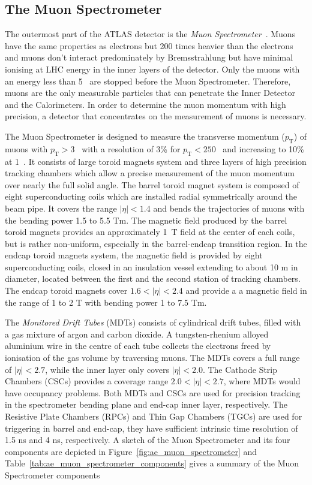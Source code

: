 
\subsection{The Muon Spectrometer}
\label{subsec:ae_the_muon_spectrometer}
The outermost part of the ATLAS detector is the \textit{Muon Spectrometer}~\cite{1748-0221-3-08-S08003,Palestini:681459,Diehl:2009bw}.
Muons have the same properties as electrons but 200 times heavier than the electrons and muons don't interact predominately by Bremsstrahlung but have minimal ionising at LHC energy in the inner layers of the detector.
Only the muons with an energy less than 5~{\GeV} are stopped before the Muon Spectrometer.
Therefore, muons are the only measurable particles that can penetrate the Inner Detector and the Calorimeters.
In order to determine the muon momentum with high precision, a detector that concentrates on the measurement of muons is necessary.

The Muon Spectrometer is designed to measure the transverse momentum ($p_{\mathrm{T}}$) of muons with $p_{\mathrm{T}} > 3$~{\GeV} with a resolution of 3\% for $p_{\mathrm{T}} < 250$~{\GeV} and increasing to 10\% at 1~{\TeV}.
It consists of large toroid magnets system and three layers of high precision tracking chambers which allow a precise measurement of the muon momentum over nearly the full solid angle.
The barrel toroid magnet system is composed of eight superconducting coils which are installed radial symmetrically around the beam pipe.
It covers the range $|\eta| < 1.4$ and bends the trajectories of muons with the bending power 1.5 to 5.5 Tm.
The magnetic field produced by the barrel toroid magnets provides an approximately 1~T field at the center of each coils, but is rather non-uniform, especially in the barrel-endcap transition region.
In the endcap toroid magnets system, the magnetic field is provided by eight superconducting coils, closed in an insulation vessel extending to about 10 m in diameter, located between the first and the second station of tracking chambers.
The endcap toroid magnets cover $1.6 < |\eta| < 2.4$ and provide a a magnetic field in the range of 1 to 2 T with bending power 1 to 7.5 Tm.

The \textit{Monitored Drift Tubes} (MDTs) consists of cylindrical drift tubes, filled with a gas mixture of argon and carbon dioxide.
A tungsten-rhenium alloyed aluminium wire in the centre of each tube collects the electrons freed by ionisation of the gas volume by traversing muons.
The MDTs covers a full range of $|\eta| < 2.7$, while the inner layer only covers $|\eta| < 2.0$.
The Cathode Strip Chambers (CSCs) provides a coverage range $2.0 < |\eta| < 2.7$, where MDTs would have occupancy problems.
Both MDTs and CSCs are used for precision tracking in the spectrometer bending plane and end-cap inner layer, respectively.
The Resistive Plate Chambers (RPCs) and Thin Gap Chambers (TGCs) are used for triggering in barrel and end-cap, they have sufficient intrinsic time resolution of 1.5 ns and 4 ns, respectively.
A sketch of the Muon Spectrometer and its four components are depicted in Figure~\ref{fig:ae_muon_spectrometer} and Table~\ref{tab:ae_muon_spectrometer_components} gives a summary of the Muon Spectrometer components

